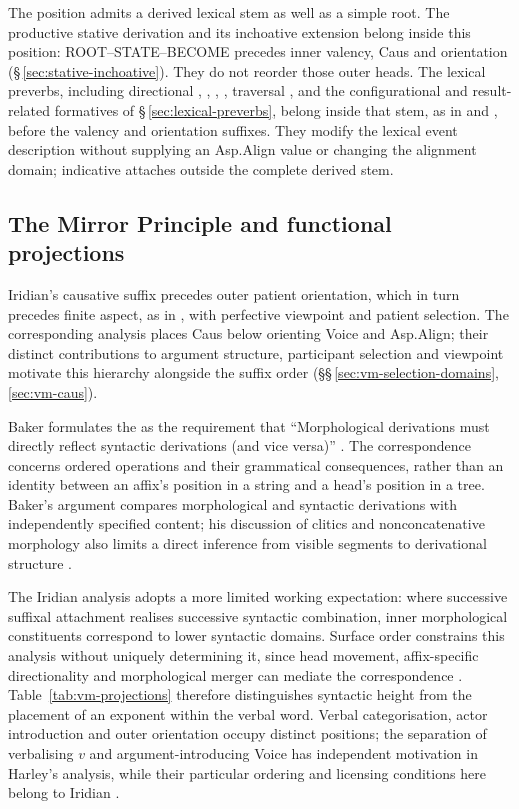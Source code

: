The \Stem{} position admits a derived lexical stem as well as a simple root.
The productive stative derivation and its inchoative extension belong inside
this position: ROOT--STATE--BECOME precedes inner valency, Caus and orientation
(§\,\ref{sec:stative-inchoative}). They do not reorder those outer heads.
The lexical preverbs, including directional , ,
, , traversal , and the configurational and
result-related formatives of §\,\ref{sec:lexical-preverbs}, belong inside
that stem, as in   and 
, before the valency and orientation suffixes. They modify the
lexical event description
without supplying an Asp.Align value or changing the alignment domain;
indicative  attaches outside the complete derived stem.


\subsection{The Mirror Principle and functional projections}
\label{sec:vm-overview}
\label{sec:vm-mirror}

\noindent Iridian's causative suffix precedes outer patient orientation,
which in turn precedes finite aspect, as in 
, with perfective viewpoint and patient selection.
The corresponding analysis places Caus below orienting Voice and Asp.Align;
their distinct contributions to argument structure, participant selection and
viewpoint motivate this hierarchy alongside the suffix order
(§§\,\ref{sec:vm-selection-domains}, \ref{sec:vm-caus}).

Baker formulates the  as the requirement that
``Morphological derivations must directly reflect syntactic derivations
(and vice versa)'' \cite[p.~375]{baker1985}. The correspondence concerns ordered
operations and their grammatical consequences, rather than an identity between
an affix's position in a string and a head's position in a tree. Baker's
argument compares morphological and syntactic derivations with independently
specified content; his discussion of clitics and nonconcatenative morphology
also limits a direct inference from visible segments to derivational structure
\cite[§§2, 5]{baker1985}.

The Iridian analysis adopts a more limited working expectation: where
successive suffixal attachment realises successive syntactic combination,
inner morphological constituents correspond to lower syntactic domains.
Surface order constrains this analysis without uniquely determining it,
since head movement, affix-specific directionality and morphological merger
can mediate the correspondence \cite{harley2011,harley2013b}.
Table~\ref{tab:vm-projections} therefore distinguishes syntactic height from
the placement of an exponent within the verbal word. Verbal categorisation,
actor introduction and outer orientation occupy distinct positions; the
separation of verbalising $v$ and argument-introducing Voice has independent
motivation in Harley's analysis, while their particular ordering and licensing
conditions here belong to Iridian \cite{harley2013a,harley2017}.

